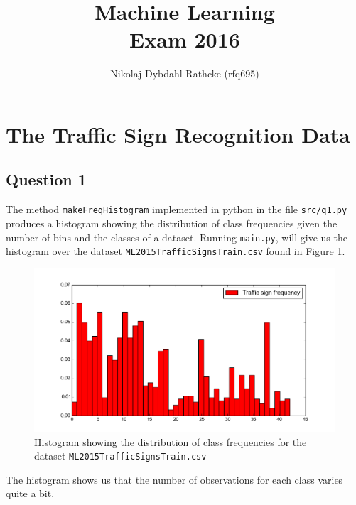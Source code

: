 \documentclass[a4paper]{article}
\author{Nikolaj Dybdahl Rathcke (rfq695)}
\title{Machine Learning \\ Exam 2016}
\begin{document}
\maketitle

\section{The Traffic Sign Recognition Data}
\subsection{Question 1}
The method \texttt{makeFreqHistogram} implemented in python in the file \texttt{src/q1.py} produces a histogram showing the distribution of class frequencies given the number of bins and the classes of a dataset. Running \texttt{main.py}, will give us the histogram over the dataset \texttt{ML2015TrafficSignsTrain.csv} found in Figure \ref{fig1}.
\begin{figure}[H]
  \centering
  \captionsetup{justification=centering,margin=2cm}
  \includegraphics[scale=0.6]{histogram1}
  \caption{Histogram showing the distribution of class frequencies for the dataset \texttt{ML2015TrafficSignsTrain.csv}}
  \label{fig1}
\end{figure}
The histogram shows us that the number of observations for each class varies quite a bit.
\end{document}
